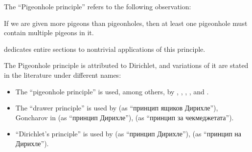 \begin{concept}\label{con:pigeonhole_principle}
  The \enquote{Pigeonhole principle} refers to the following observation:
  \begin{displayquote}
    If we are given more pigeons than pigeonholes, then at least one pigeonhole must contain multiple pigeons in it.
  \end{displayquote}

   dedicates entire sections to nontrivial applications of this principle.

  The Pigeonhole principle is attributed to Dirichlet, and variations of it are stated in the literature under different names:
  \begin{itemize}
    \item The \enquote{pigeonhole principle} is used, among others, by , , , ,  and .
    \item The \enquote{drawer principle} is used by  (as \enquote{принцип ящиков Дирихле}), Goncharov in \cite[156]{АлександровМаркушевичХинчинИПр1952ЭнциклопедияТом3} (as \enquote{принцип Дирихле}),  (as \enquote{принцип за чекмеджетата}).
    \item \enquote{Dirichlet's principle} is used by  (as \enquote{принцип Дирихле}),  (as \enquote{принцип на Дирихле}).
  \end{itemize}
\end{concept}

